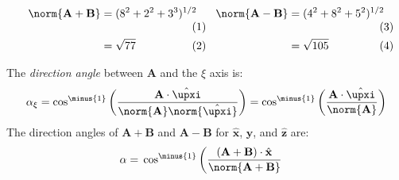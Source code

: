 \begin{solution}
                \begin{subequations}
                    \begin{minipage}{0.49\textwidth}
                        \centering
                        \begin{align}
                            \norm{\mathbf{A+B}}
                            &=(8^{2}+2^{2}+3^{3})^{1/2}\\
                            &=\sqrt{77}
                        \end{align}
                    \end{minipage}
                    \hfill
                    \begin{minipage}{0.49\textwidth}
                        \centering
                        \begin{align}
                            \norm{\mathbf{A-B}}
                            &=(4^{2}+8^{2}+5^{2})^{1/2}\\
                            &=\sqrt{105}
                        \end{align}
                    \end{minipage}
                \end{subequations}
                \par\hfill\par
                The \textit{direction angle}
                between $\mathbf{A}$ and the $\xi$ axis is:
                \begin{equation}
                    \alpha_{\xi}=\cos^{\minus{1}}\bigg(
                        \frac{\mathbf{A}\cdot\hat{\boldsymbol{\upxi}}}
                        {\norm{\mathbf{A}}
                        \norm{\hat{\boldsymbol{\upxi}}}}
                    \bigg)
                    =\cos^{\minus{1}}\bigg(
                        \frac{\mathbf{A}\cdot\hat{\boldsymbol{\upxi}}}
                        {\norm{\mathbf{A}}}
                    \bigg)
                \end{equation}
                The direction angles of $\mathbf{A}+\mathbf{B}$
                and $\mathbf{A}-\mathbf{B}$ for
                $\hat{\mathbf{x}}$, $\hat{\mathbf{y}}$,
                and $\hat{\mathbf{z}}$ are:
                \begin{subequations}
                    \begin{align}
                        \alpha=\;&\cos^{\minus{1}}\bigg(
                            \frac{(\mathbf{A}+\mathbf{B})
                            \cdot\hat{\mathbf{x}}}
                            {\norm{\mathbf{A+B}}}

\end{align}
\end{subequations}
\end{solution}
